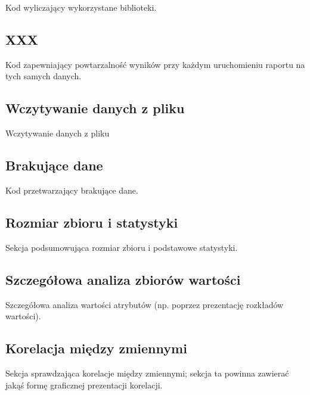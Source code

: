 \documentclass[]{article}
\begin{document}
Kod wyliczający wykorzystane biblioteki.

\hypertarget{xxx}{%
\subsection{XXX }\label{xxx}}

Kod zapewniający powtarzalność wyników przy każdym uruchomieniu raportu
na tych samych danych.

\hypertarget{wczytywanie-danych-z-pliku}{%
\subsection{Wczytywanie danych z pliku
}\label{wczytywanie-danych-z-pliku}}

Wczytywanie danych z pliku

\hypertarget{brakujux105ce-dane}{%
\subsection{Brakujące dane }\label{brakujux105ce-dane}}

Kod przetwarzający brakujące dane.

\hypertarget{rozmiar-zbioru-i-statystyki}{%
\subsection{Rozmiar zbioru i statystyki
}\label{rozmiar-zbioru-i-statystyki}}

Sekcja podsumowująca rozmiar zbioru i podstawowe statystyki.

\hypertarget{szczeguxf3ux142owa-analiza-zbioruxf3w-wartoux15bci}{%
\subsection{Szczegółowa analiza zbiorów wartości
}\label{szczeguxf3ux142owa-analiza-zbioruxf3w-wartoux15bci}}

Szczegółowa analiza wartości atrybutów (np. poprzez prezentację
rozkładów wartości).

\hypertarget{korelacja-miux119dzy-zmiennymi}{%
\subsection{Korelacja między zmiennymi
}\label{korelacja-miux119dzy-zmiennymi}}

Sekcja sprawdzająca korelacje między zmiennymi; sekcja ta powinna
zawierać jakąś formę graficznej prezentacji korelacji.
\end{document}
